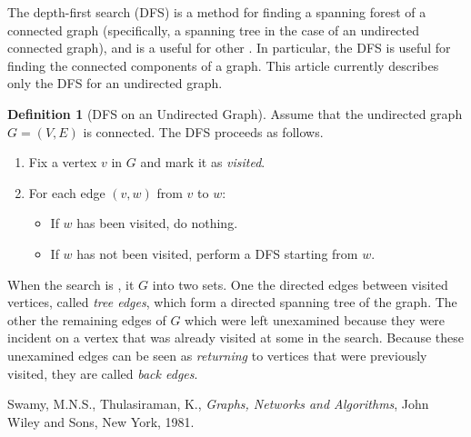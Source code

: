 \documentclass[12pt]{article}
\begin{document}
The depth-first search (DFS)  is a method for finding a spanning forest of a connected graph (specifically, a spanning tree in the case of an undirected connected graph), and is a useful  for other . In particular, the DFS is useful for finding the connected components of a graph. This article currently describes only the DFS for an undirected graph.

\theoremstyle{definition}
\newtheorem*{undirectedDfs}{Definition}
\begin{undirectedDfs}[DFS on an Undirected Graph]
Assume that the undirected graph $G = (V,E)$ is connected. The DFS proceeds as follows.

\begin{enumerate}
\item
Fix a vertex $v$ in $G$ and mark it as \emph{visited}.
\item
For each edge $(v,w)$  from $v$ to $w$:
  \begin{itemize}
  \item
  If $w$ has been visited, do nothing.
  \item
  If $w$ has not been visited, perform a DFS starting from $w$.
  \end{itemize}
\end{enumerate}

When the search is , it  $G$ into two sets. One  the directed edges between visited vertices, called \emph{tree edges}, which form a directed spanning tree of the graph. The other  the remaining edges of $G$ which were left unexamined because they were incident on a vertex that was already visited at some  in the search. Because these unexamined edges can be seen as \emph{returning} to vertices that were previously visited, they are called \emph{back edges}.

\end{undirectedDfs}

\begin{thebibliography}{9}
Swamy, M.N.S., Thulasiraman, K., \emph{Graphs, Networks and Algorithms}, John Wiley and Sons, New York, 1981.
\end{thebibliography}
\end{document}
